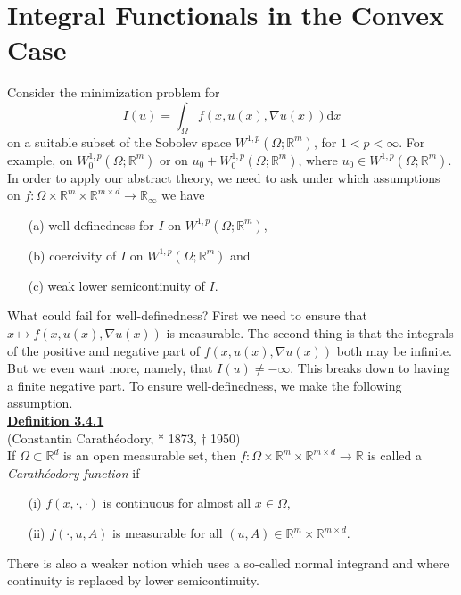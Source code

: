 \section{Integral Functionals in the Convex Case}
Consider the minimization problem for
\[I(u)=\int_\Omega{f(x,u(x),\nabla u(x))\mathrm{d}x}\]
on a suitable subset of the Sobolev space $W^{1,p}(\Omega;\mathbb{R}^m)$, for $1<p<\infty$. For example, on $W_0^{1,p}(\Omega;\mathbb{R}^m)$ or on $u_0+W_0^{1,p}(\Omega;\mathbb{R}^m)$, where $u_0\in W^{1,p}(\Omega;\mathbb{R}^m)$. In order to apply our abstract theory, we need to ask under which assumptions on $f:\Omega\times\mathbb{R}^m\times\mathbb{R}^{m\times d}\longrightarrow\mathbb{R}_\infty$ we have
\begin{itemize}
	\item[(a)] well-definedness for $I$ on $W^{1,p}(\Omega;\mathbb{R}^m)$,
	\item[(b)] coercivity of $I$ on $W^{1,p}(\Omega;\mathbb{R}^m)$ and
	\item[(c)] weak lower semicontinuity of $I$.\\
\end{itemize}

What could fail for well-definedness? First we need to ensure that $x\longmapsto f(x,u(x),\nabla u(x))$ is measurable. The second thing is that the integrals of the positive and negative part of $f(x,u(x),\nabla u(x))$ both may be infinite. But we even want more, namely, that $I(u)\ne-\infty$. This breaks down to having a finite negative part. To ensure well-definedness, we make the following assumption.\\

\textbf{\underline{Definition 3.4.1}}\\
(Constantin Carath\'eodory, * 1873, $\dagger$ 1950)\\
If $\Omega\subset\mathbb{R}^d$ is an open measurable set, then $f:\Omega\times\mathbb{R}^m\times\mathbb{R}^{m\times d}\longrightarrow\mathbb{R}$ is called a \textit{Carath\'eodory function} if
\begin{itemize}
	\item[(i)] $f(x,\cdot,\cdot)$ is continuous for almost all $x\in\Omega$,
	\item[(ii)] $f(\cdot,u,A)$ is measurable for all $(u,A)\in\mathbb{R}^m\times\mathbb{R}^{m\times d}$.\\
\end{itemize}

There is also a weaker notion which uses a so-called normal integrand and where continuity is replaced by lower semicontinuity.\\[11pt]

